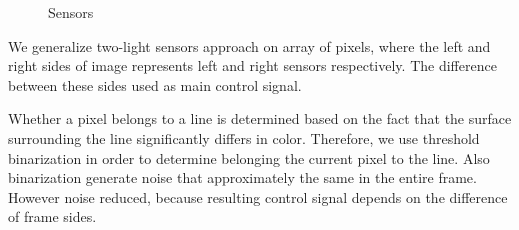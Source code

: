 \documentclass[a4paper,12pt]{article} %
\begin{document}
\begin{enumerate}
\begin{figure}
\begin{minipage}[h]{0.30\linewidth}
		\end{minipage}
		\caption{Sensors}
		\label{fig:sensor}
	\end{figure}


	We generalize two-light sensors approach on array of pixels, where the left and right sides of image represents left and right sensors respectively. The difference between these sides used as main control signal.  
	
	Whether a pixel belongs to a line is determined based on the fact that the surface surrounding the line significantly differs in color. Therefore, we use threshold binarization in order to determine belonging the current pixel to the line. Also binarization generate noise that approximately the same in the entire frame. However noise reduced, because resulting control signal depends on the difference of frame sides.
	

\end{enumerate}
\end{document}
